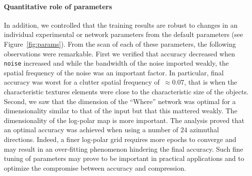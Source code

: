 \paragraph{Quantitative role of parameters}
In addition, we controlled that the training results are robust to changes in an individual experimental or network parameters from the default parameters (see Figure~\ref{fig:params}). From the scan of each of these parameters, the following observations were remarkable. First we verified that accuracy decreased when \texttt{noise} increased and while the bandwidth of the noise imported weakly, the spatial frequency of the noise was an important factor. In particular, final accuracy was worst for a clutter spatial frequency of~$\approx 0.07$, that is when the characteristic textures elements were close to the characteristic size of the objects. Second, we saw that the dimension of the ``Where'' network was optimal for a dimensionality similar to that of the input but that this mattered weakly. The dimensionality of the log-polar map is more important. The analysis proved that an optimal accuracy was achieved when using a number of $24$ azimuthal directions. Indeed, a finer log-polar grid requires more epochs to converge and may result in an over-fitting phenomenon hindering the final accuracy. Such fine tuning of parameters may prove to be important in practical applications and to optimize the compromise between accuracy and compression.
